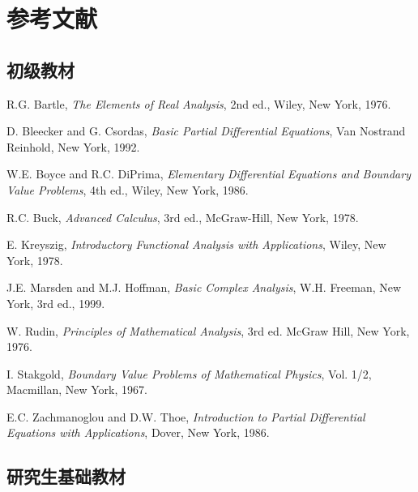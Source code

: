 \clearpage\appendix\section{参考文献}\label{chap:source-reference-appendix}

\subsection{初级教材}\label{sec:references-elementary-texts}

\begin{list}{}{\setlength{\labelwidth}{3em}\setlength{\leftmargin}{4em}\setlength{\labelsep}{.8em}}
\item[{[Bar]}] R.G. Bartle, \emph{The Elements of Real Analysis}, 2nd ed., Wiley, New York, 1976.

\item[{[BC]}] D. Bleecker and G. Csordas, \emph{Basic Partial Differential Equations}, Van Nostrand Reinhold, New York, 1992.

\item[{[BD]}] W.E. Boyce and R.C. DiPrima, \emph{Elementary Differential Equations and Boundary Value Problems}, 4th ed., Wiley, New York, 1986.

\item[{[Bu]}] R.C. Buck, \emph{Advanced Calculus}, 3rd ed., McGraw-Hill, New York, 1978.

\item[{[Kr]}] E. Kreyszig, \emph{Introductory Functional Analysis with Applications}, Wiley, New York, 1978.

\item[{[MH]}] J.E. Marsden and M.J. Hoffman, \emph{Basic Complex Analysis}, W.H. Freeman, New York, 3rd ed., 1999.

\item[{[Rud]}] W. Rudin, \emph{Principles of Mathematical Analysis}, 3rd ed. McGraw Hill, New York, 1976.

\item[{[Stak]}] I. Stakgold, \emph{Boundary Value Problems of Mathematical Physics}, Vol. 1/2, Macmillan, New York, 1967.

\item[{[ZT]}] E.C. Zachmanoglou and D.W. Thoe, \emph{Introduction to Partial Differential Equations with Applications}, Dover, New York, 1986.
\end{list}

\subsection{研究生基础教材}\label{sec:references-basic-graduate-texts}

